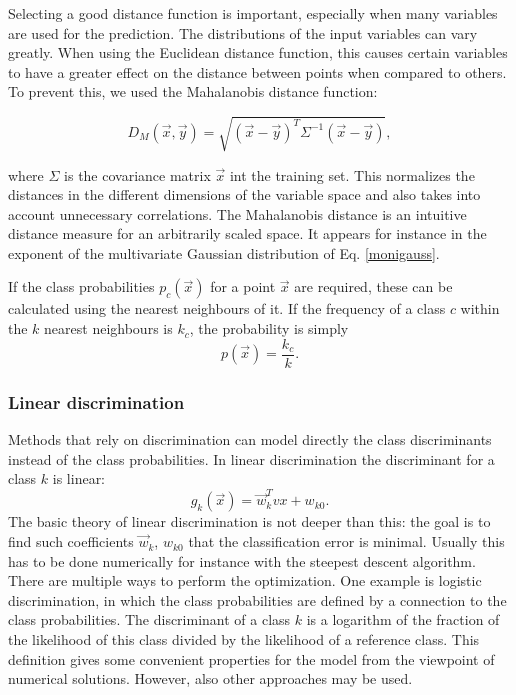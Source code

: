\documentclass[twoside]{article}
\renewcommand{\v}[1]{\vec{#1}}
\begin{document}
\begin{multicols}{2}
Selecting a good distance function is important, especially when many variables
are used for the prediction. The distributions of the
input variables can vary greatly. When using the Euclidean distance function,
this causes certain variables to have a greater effect on the distance between
points when compared to others. To prevent this, we used the Mahalanobis
distance function\cite[p.~88]{Alpaydin}:

\begin{equation}\label{eq:mahalanobis}
  D_M(\v{x}, \v{y}) = \sqrt{(\v{x}-\v{y})^T \Sigma^{-1} (\v{x}-\v{y})},
\end{equation}

where $\Sigma$ is the covariance matrix $\v{x}$ int the training set.
This normalizes the distances in the different dimensions of
the variable space and also takes into account unnecessary correlations.
The Mahalanobis distance is an intuitive distance measure for an arbitrarily
scaled space. It appears for instance in the exponent of the multivariate
Gaussian distribution of Eq. \eqref{monigauss}.

If the class probabilities $p_c(\v{x})$ for a point $\v{x}$ are required, these can
be calculated using the nearest neighbours of it. If the frequency of a class $c$
within the $k$ nearest neighbours is $k_c$, the probability is simply
\begin{equation}
 p(\v{x}) = \frac{k_c}{k}.
\end{equation}

\subsubsection{Linear discrimination}\label{method:ldiskr}

Methods that rely on discrimination can model directly the class discriminants instead of
the class probabilities. In linear discrimination the discriminant for a class $k$ is linear:
\begin{equation}
 g_k(\v{x}) = \v{w}_k^T v{x} + w_{k0}.
\end{equation}
The basic theory of linear discrimination is not deeper than this: the goal is to find such
coefficients $\v{w}_k$, $w_{k0}$ that the classification error is minimal. Usually this has
to be done numerically for instance with the steepest descent algorithm. There are multiple 
ways to perform the optimization. One example
is logistic discrimination, in which the class probabilities are defined by a connection to the class
probabilities. The discriminant of a class $k$ is a logarithm of the fraction of the likelihood of
this class divided by the likelihood of a reference class. This definition gives some convenient 
properties for the model from the viewpoint of numerical solutions. However, also other
approaches may be used.


\end{multicols}
\end{document}
